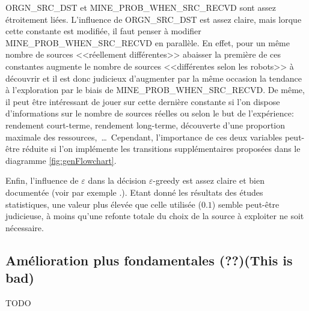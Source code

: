 {\ttfamily ORGN\_SRC\_DST} et {\ttfamily MINE\_PROB\_WHEN\_SRC\_RECVD} sont assez étroitement liées. L'influence de {\ttfamily ORGN\_SRC\_DST} est assez claire, mais lorque cette constante est modifiée, il faut penser à modifier {\ttfamily MINE\_PROB\_WHEN\_SRC\_RECVD} en parallèle. En effet, pour un même nombre de sources <<réellement différentes>> abaisser la première de ces constantes augmente le nombre de sources <<différentes selon les robots>> à découvrir et il est donc judicieux d'augmenter par la même occasion la tendance à l'exploration par le biais de {\ttfamily MINE\_PROB\_WHEN\_SRC\_RECVD}. De même, il peut être intéressant de jouer sur cette dernière constante si l'on dispose d'informations sur le nombre de sources réelles ou selon le but de l'expérience: rendement court-terme, rendement long-terme, découverte d'une proportion maximale des ressources,~\ldots\ Cependant, l'importance de ces deux variables peut-être réduite si l'on implémente les transitions supplémentaires proposées dans le diagramme \ref{fig:genFlowchart}.

Enfin, l'influence de $\varepsilon$ dans la décision $\varepsilon$-greedy est assez claire et bien documentée (voir par exemple \cite{foraging}.). Etant donné les résultats des études statistiques, une valeur plus élevée que celle utilisée ($0.1$) semble peut-être judicieuse, à moins qu'une refonte totale du choix de la source à exploiter ne soit nécessaire.

\subsection{Amélioration plus fondamentales (??)(This is bad)}

TODO

